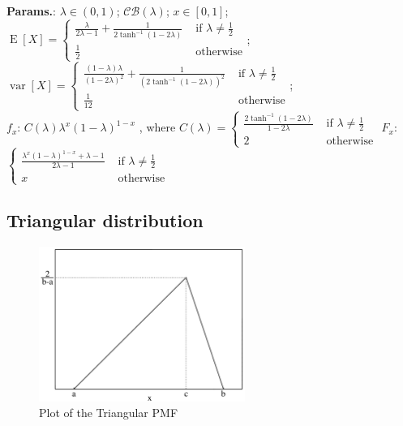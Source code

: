     {\color{darkblue} \textbf{Params.}:} {$\lambda \in (0,1)$}; {$\mathcal{CB}(\lambda)$}; {$x \in [0, 1]$}; {$\operatorname{E}[X] = \begin{cases} \frac{\lambda}{2\lambda - 1} + \frac{1}{2 \tanh^{-1}(1-2\lambda)} &\text{ if } \lambda \ne \frac{1}{2} \\ \frac{1}{2} &\text{ otherwise} \end{cases}\!$}; {$\operatorname{var}[X] = \begin{cases} \frac{(1-\lambda) \lambda}{(1-2\lambda)^2} + \frac{1}{(2 \tanh^{-1}(1-2\lambda))^2} &\text{ if } \lambda \ne \frac{1}{2} \\ \frac{1}{12} &\text{ otherwise} \end{cases}\!$};\hspace{0.5cm}\\{\color{darkblue} \textbf{$f_x$}:} {$C(\lambda) \lambda^x (1-\lambda)^{1-x}\!$ , where $C(\lambda) = \begin{cases} \frac{2 \tanh^{-1}(1-2\lambda)}{1-2\lambda} &\text{ if } \lambda \ne \frac{1}{2} \\ 2 &\text{ otherwise} \end{cases} $}{\color{darkblue} \textbf{$F_x$}:} {$\begin{cases} \frac{\lambda^x (1-\lambda)^{1-x} + \lambda - 1}{2\lambda - 1} &\text{ if } \lambda \ne \frac{1}{2} \\ x &\text{ otherwise} \end{cases}\!$}



    
        
\subsection{Triangular distribution}


    \begin{figure}[H]
        \centering
        \includegraphics[width=0.6\textwidth]{images/Triangular distribution PMF.png}
        \caption{Plot of the Triangular PMF}
    \end{figure}




